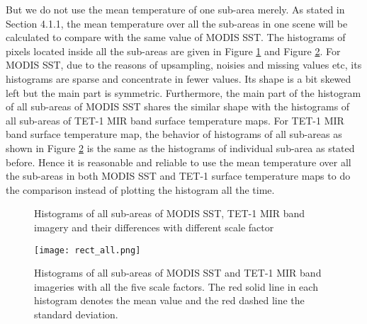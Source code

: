 \noindent But we do not use the mean temperature of one sub-area merely. As stated in Section 4.1.1, the mean temperature over all the sub-areas in one scene will be calculated to compare with the same value of MODIS SST. The histograms of pixels located inside all the sub-areas are given in Figure \ref{fig:hist_all_rect} and Figure \ref{fig:rect_all_sc_all}. For MODIS SST, due to the reasons of upsampling, noisies and missing values etc, its histograms are sparse and concentrate in fewer values. Its shape is a bit skewed left but the main part is symmetric. Furthermore, the main part of the histogram of all sub-areas of MODIS SST shares the similar shape with the histograms of all sub-areas of TET-1 MIR band surface temperature maps. For TET-1 MIR band surface temperature map, the behavior of histograms of all sub-areas as shown in Figure \ref{fig:rect_all_sc_all} is the same as the histograms of individual sub-area as stated before. Hence it is reasonable and reliable to use the mean temperature over all the sub-areas in both MODIS SST and TET-1 surface temperature maps to do the comparison instead of plotting the histogram all the time.\\

\begin{figure}[!htbp]
\centering
{}
\vspace{0.1in}
\caption{Histograms of all sub-areas of MODIS SST, TET-1 MIR band imagery and their differences with different scale factor}
\label{fig:hist_all_rect}
\end{figure}

\begin{figure}[!htbp]
\centering
\texttt{[image: rect\_all.png]}
\caption{Histograms of all sub-areas of MODIS SST and TET-1 MIR band imageries with all the five scale factors. The red solid line in each histogram denotes the mean value and the red dashed line the standard deviation.}
\label{fig:rect_all_sc_all}
\end{figure}

